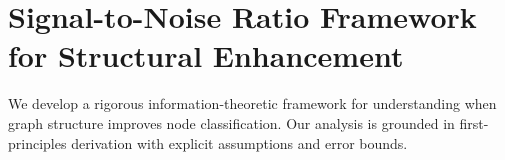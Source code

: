 
\section{Signal-to-Noise Ratio Framework for Structural Enhancement}
\label{sec:snr_theory_rigorous}

We develop a rigorous information-theoretic framework for understanding when graph structure improves node classification. Our analysis is grounded in first-principles derivation with explicit assumptions and error bounds.

